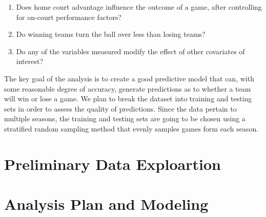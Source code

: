 \documentclass[12pt]{article}\usepackage[]{graphicx}\usepackage[]{color}
\begin{document}
\begin{enumerate}
\item %
Does home court advantage influence the outcome of a game, after controlling for on-court performance factors?

\item %
Do winning teams turn the ball over less than losing teams?

\item %
Do any of the variables measured modify the effect of other covariates of interest?

\end{enumerate}

The key goal of the analysis is to create a good predictive model that can, with some reasonable degree of accuracy, generate predictions as to whether a team will win or lose a game.  We plan to break the dataset into training and testing sets in order to assess the quality of predictions.  Since the data pertain to multiple seasons, the training and testing sets are going to be chosen using a stratified random sampling method that evenly samples games form each season. 

\section{Preliminary Data Exploartion}

\section{Analysis Plan and Modeling}
\end{document}
